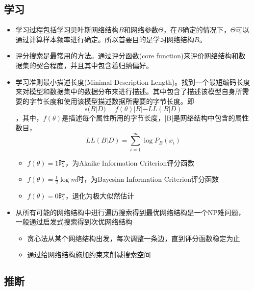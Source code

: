 \subsection{学习}

\begin{itemize}
\item 学习过程包括学习贝叶斯网络结构$B$和网络参数$\Theta$，在$B$确定的情况下，$\Theta$可以通过计算样本频率进行确定。所以首要目的是学习网络结构$B$。
\item 评分搜索是最常用的方法。通过评分函数(core function)来评价网络结构和数据集的契合程度，并且其中包含着归纳偏好。
\item 学习准则最小描述长度(Minimal Description Length)。找到一个最短编码长度来对模型和数据集中的数据分布来进行描述。其中包含了描述该模型自身所需要的字节长度和使用该模型描述数据所需要的字节长度。即\begin{equation}s(B|D)=f(\theta)|B|-LL(B|D)\end{equation}，其中，$f(\theta)$是描述每个属性所用的字节长度，|B|是网络结构中包含的属性数目，\begin{equation}LL(B|D)=\sum_{i=1}^m\log P_B(x_i)\end{equation}
    \begin{itemize}
    \item $f(\theta)=1$时，为Akaike Information Criterion评分函数
    \item $f(\theta)=\frac{1}{2}\log m$时，为Bayesian Information Criterion评分函数
    \item $f(\theta)=0$时，退化为极大似然估计
    \end{itemize}
\item 从所有可能的网络结构中进行遍历搜索得到最优网络结构是一个NP难问题，一般通过启发式搜索得到次优网络结构
    \begin{itemize}
    \item 贪心法从某个网络结构出发，每次调整一条边，直到评分函数稳定为止
    \item 通过给网络结构施加约束来削减搜索空间
    \end{itemize}
\end{itemize}

\subsection{推断}

